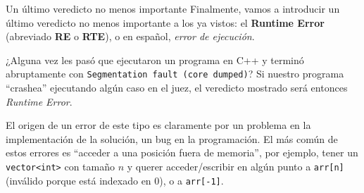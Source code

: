\documentclass{beamer}
\begin{document}
    \begin{frame}{Un último veredicto no menos importante}
        Finalmente, vamos a introducir un último veredicto no menos importante a los ya vistos: el \textbf{Runtime Error} (abreviado \textbf{RE} o \textbf{RTE}), o en español, \textit{error de ejecución}. \pause

        ¿Alguna vez les pasó que ejecutaron un programa en C++ y terminó abruptamente con \texttt{Segmentation fault (core dumped)}? \pause Si nuestro programa ``crashea'' ejecutando algún caso en el juez, el veredicto mostrado será entonces \textit{Runtime Error}. \vspace{4pt} \pause

        El origen de un error de este tipo es claramente por un problema en la implementación de la solución, un bug en la programación. El más común de estos errores es ``acceder a una posición fuera de memoria'', por ejemplo, tener un \texttt{vector<int>} con tamaño $n$ y querer acceder/escribir en algún punto a \texttt{arr[n]} (inválido porque está indexado en 0), o a \texttt{arr[-1]}.
    \end{frame}
\end{document}
